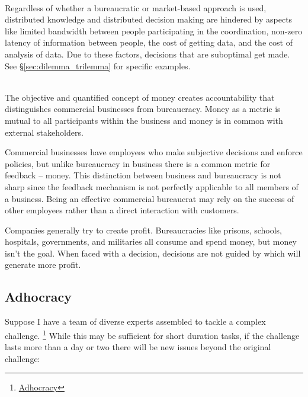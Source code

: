 \ \\

Regardless of whether a bureaucratic or market-based approach is used, 
distributed knowledge and distributed decision making are hindered by aspects like
limited bandwidth between people participating in the coordination,
non-zero latency of information between people,
the cost of getting data,
and
the cost of analysis of data.
Due to these factors, decisions that are suboptimal get made. See \S\ref{sec:dilemma_trilemma} for specific examples.

\ \\

The objective and quantified concept of money creates accountability that distinguishes commercial businesses from bureaucracy. Money as a metric is mutual to all participants within the business and money is in common with external stakeholders. 

Commercial businesses have employees who make subjective decisions and enforce policies, but unlike bureaucracy in business there is a common metric for feedback -- money. This distinction between business and bureaucracy is not sharp since the feedback mechanism is not perfectly applicable to all members of a business. Being an effective commercial bureaucrat may rely on the success of other employees rather than a direct interaction with customers.

Companies generally try to create profit. 
Bureaucracies like prisons, schools, hospitals, governments, and militaries all consume and spend money, but money isn't the goal. When faced with a decision, decisions are not guided by which will generate more profit. \cite{2012_Wilson}

\subsection{Adhocracy}

Suppose I have a team of diverse experts assembled to tackle a complex challenge.
\footnote{\href{https://en.wikipedia.org/wiki/Adhocracy}{Adhocracy}}
While this may be sufficient for short duration tasks, if the challenge lasts more than a day or two there will be new issues beyond the original challenge:

